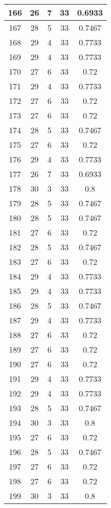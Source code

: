 \documentclass[letterpaper, 12pt]{article}
\begin{document}
\begin{longtable}{|c|c|c|c|c|}
\hline
166 & 26 & 7 & 33 & 0.6933 \\
\hline
167 & 28 & 5 & 33 & 0.7467 \\
\hline
168 & 29 & 4 & 33 & 0.7733 \\
\hline
169 & 29 & 4 & 33 & 0.7733 \\
\hline
170 & 27 & 6 & 33 & 0.72 \\
\hline
171 & 29 & 4 & 33 & 0.7733 \\
\hline
172 & 27 & 6 & 33 & 0.72 \\
\hline
173 & 27 & 6 & 33 & 0.72 \\
\hline
174 & 28 & 5 & 33 & 0.7467 \\
\hline
175 & 27 & 6 & 33 & 0.72 \\
\hline
176 & 29 & 4 & 33 & 0.7733 \\
\hline
177 & 26 & 7 & 33 & 0.6933 \\
\hline
178 & 30 & 3 & 33 & 0.8 \\
\hline
179 & 28 & 5 & 33 & 0.7467 \\
\hline
180 & 28 & 5 & 33 & 0.7467 \\
\hline
181 & 27 & 6 & 33 & 0.72 \\
\hline
182 & 28 & 5 & 33 & 0.7467 \\
\hline
183 & 27 & 6 & 33 & 0.72 \\
\hline
184 & 29 & 4 & 33 & 0.7733 \\
\hline
185 & 29 & 4 & 33 & 0.7733 \\
\hline
186 & 28 & 5 & 33 & 0.7467 \\
\hline
187 & 29 & 4 & 33 & 0.7733 \\
\hline
188 & 27 & 6 & 33 & 0.72 \\
\hline
189 & 27 & 6 & 33 & 0.72 \\
\hline
190 & 27 & 6 & 33 & 0.72 \\
\hline
191 & 29 & 4 & 33 & 0.7733 \\
\hline
192 & 29 & 4 & 33 & 0.7733 \\
\hline
193 & 28 & 5 & 33 & 0.7467 \\
\hline
194 & 30 & 3 & 33 & 0.8 \\
\hline
195 & 27 & 6 & 33 & 0.72 \\
\hline
196 & 28 & 5 & 33 & 0.7467 \\
\hline
197 & 27 & 6 & 33 & 0.72 \\
\hline
198 & 27 & 6 & 33 & 0.72 \\
\hline
199 & 30 & 3 & 33 & 0.8 \\
\hline
\end{longtable}
\end{document}
